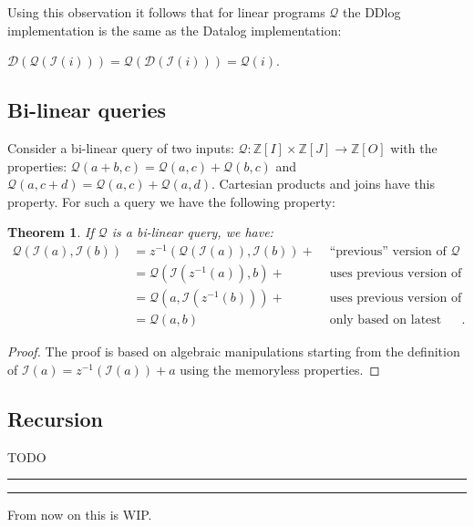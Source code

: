 \documentclass[10pt]{article}
\newtheorem{theorem}{Theorem}[section]
\newcommand{\code}[1]{\texttt{#1}}
\newcommand{\Z}{\mathbb{Z}}  %
\newcommand{\zm}{\ensuremath{z^{-1}}} %
\newcommand{\I}{\mathcal{I}}  %
\newcommand{\D}{\mathcal{D}}  %
\newcommand{\q}{\ensuremath{\mathcal{Q}}}  %
\begin{document}
Using this observation it follows that for linear programs $\q$ the
DDlog implementation is the same as the Datalog implementation:

$\D(\q(\I(i))) = \q(\D(\I(i))) = \q(i)$.

\subsection{Bi-linear queries}

Consider a bi-linear query of two inputs: $\q : \Z[I] \times
\Z[J] \rightarrow \Z[O]$ with the properties: $\q(a + b, c) = \q(a,
c) + \q(b, c)$ and $\q(a, c + d) = \q(a, c) + \q(a, d)$.  Cartesian
products and joins have this property.  For such a query we have the
following property:

\begin{theorem}
  If $\q$ is a bi-linear query, we have:
  $$
  \begin{aligned}
    \q(\I(a), \I(b)) &= \zm(\q(\I(a)), \I(b)) + & \mbox{ ``previous''
      version of }\q \\
    &= \q(\I(\zm(a)), b) +& \mbox{ uses previous version of left input}\\
    &= \q(a, \I(\zm(b))) + & \mbox{ uses previous version of right input} \\
    &= \q(a, b) & \mbox{ only based on latest changes}.
  \end{aligned}
$$
\end{theorem}
\begin{proof}
  The proof is based on algebraic manipulations starting from the
  definition of $\I(a) = \zm(\I(a)) + a$ using the memoryless properties.
\end{proof}

\subsection{Recursion}

TODO

\hrule
\hrule
\pagebreak

From now on this is WIP.

\begin{comment}
\subsection{DDlog types}

\[\frac{\code{A}: T, \code{B}: S}{\code{(A,B)}: T \times S}\]
\[\frac{\code{A}: T, \code{B}: S}{\code{function(x:A):B}: A \rightarrow B}\]
\[\frac{\code{T1}: T_1, \code{T2}: T_2}{\code{T1 | T2} : T_1 \oplus T_2}\]
\[\frac{\code{T1}: T_1, \code{T2}: T_2}{\code{Constructor\{f1: T1, f2:
    T2\}} : \string \rightarrow T_1 \oplus T_2}\]
\end{comment}
\end{document}

